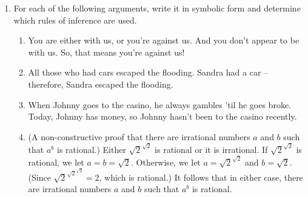 \begin{enumerate}
\item For each of the following arguments, write it in symbolic form and determine 
which rules of inference are used.

\begin{enumerate}
\item \rule{0pt}{24pt} You are either with us, or you're against us.  And you don't appear to be with us.
So, that means you're against us!


\wbvfill

\item \rule{0pt}{24pt} All those who had cars escaped the flooding.  Sandra had a car -- therefore, Sandra
escaped the flooding.


\wbvfill

\item \rule{0pt}{24pt}  When Johnny goes to the casino, he always gambles 'til he goes broke.  Today, Johnny
has money, so Johnny hasn't been to the casino recently.

\wbvfill

\item \rule{0pt}{24pt} (A non-constructive proof that there are 
irrational numbers $a$ and $b$ such that $a^b$ is rational.)  
Either $\sqrt{2}^{\sqrt{2}}$ is rational or it is irrational.
If $\sqrt{2}^{\sqrt{2}}$ is rational, we let $a=b=\sqrt{2}$.
Otherwise, we let $a=\sqrt{2}^{\sqrt{2}}$ and $b=\sqrt{2}$.
(Since $\sqrt{2}^{\sqrt{2}^{\sqrt{2}}} = 2$, which is rational.) It follows that in either case, there
are irrational numbers $a$ and $b$ such that $a^b$ is rational.


\end{enumerate}
\end{enumerate}
